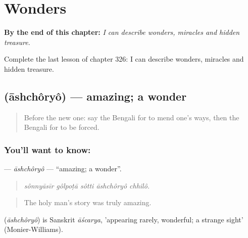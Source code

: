 
\chapter{Wonders}
\label{ch:bn-wonders}

\begin{chapteropening}
\textbf{By the end of this chapter:} \emph{I can describe wonders, miracles and hidden treasure.}

Complete the last lesson of chapter 326: I can describe wonders, miracles and hidden treasure.
\end{chapteropening}

\section[\texorpdfstring{\bn{আশ্চর্য} (āshchôryô)}{আশ্চর্য (āshchôryô)}]{ (āshchôryô) — amazing; a wonder}

\label{lesson:BN-C326-ashchoryo}



\begin{quote}
Before the new one: say the Bengali for to mend one's ways, then the Bengali for to be forced.
\end{quote}

\subsection*{You'll want to know: }
\textbf{} — \emph{āshchôryô} — \textquotedblleft{}amazing; a wonder\textquotedblright{}.

\begin{quote}
    
\end{quote}

\begin{quote}
\emph{sônnyāsīr gôlpoṭā sôtti āshchôryô chhilô.}
\end{quote}

\begin{quote}
The holy man's story was truly amazing.
\end{quote}

\begin{cousinweb}
\textbf{} (\emph{āshchôryô}) is Sanskrit \emph{āścarya}, 'appearing rarely, wonderful; a strange sight' (Monier-Williams).
\end{cousinweb}

